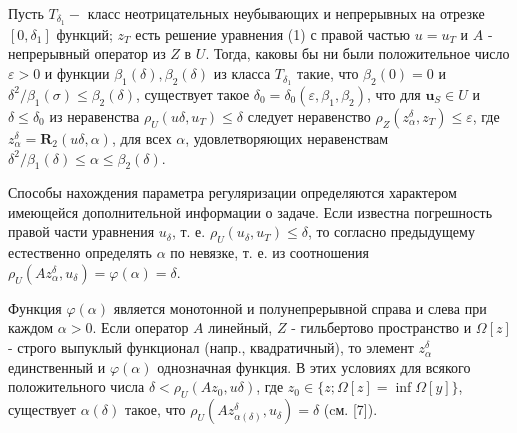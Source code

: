 \documentclass[10pt]{article}
\begin{document}
Пусть $T_{\delta_{1}}-$ класс неотрицательных неубывающих и непрерывных на отрезке $\left[0, \delta_{1}\right]$ функций; $z_{T}$ есть решение уравнения (1) с правой частью $u=u_{T}$ и $A$ - непрерывный оператор из $Z$ в $U$. Тогда, каковы бы ни были положительное число $\varepsilon>0$ и функции $\beta_{1}(\delta), \beta_{2}(\delta)$ из класса $T_{\delta_{1}}$ такие, что $\beta_{2}(0)=0$ и $\delta^{2} / \beta_{1}(\sigma) \leqslant \beta_{2}(\delta)$, существует такое $\delta_{0}=\delta_{0}\left(\varepsilon, \beta_{1}, \beta_{2}\right)$, что для $\boldsymbol{u}_{S} \in U$ и $\delta \leqslant \delta_{0}$ из неравенства $\rho_{U}\left(u \delta, u_{T}\right) \leqslant \delta$ следует неравенство $\rho_{Z}\left(z_{\alpha}^{\delta}, z_{T}\right) \leqslant \varepsilon$, где $z_{\alpha}^{\delta}=\boldsymbol{R}_{2}(u \delta, \alpha)$, для всех $\alpha$, удовлетворяющих неравенствам $\delta^{2} / \beta_{1}(\delta) \leqslant \alpha \leqslant \beta_{2}(\delta)$.



Способы нахождения параметра регуляризации определяются характером имеющейся дополнительной информации о задаче. Если известна погрешность правой части уравнения $u_{\delta}$, т. е. $\rho_{U}\left(u_{\delta}, u_{T}\right) \leqslant \delta$, то согласно предыдущему естественно определять $\alpha$ по невязке, т. е. из соотношения $\rho_{U}\left(A z_{\alpha}^{\delta}, u_{\delta}\right)=\varphi(\alpha)=\delta$.



Функция $\varphi(\alpha)$ является монотонной и полунепрерывной справа и слева при каждом $\alpha>0$. Если оператор $A$ линейный, $Z$ - гильбертово пространство и $\Omega[z]$ - строго выпуклый функционал (напр., квадратичный), то элемент $z_{\alpha}^{\delta}$ единственный и $\varphi(\alpha)$ однозначная функция. В этих условиях для всякого положительного числа $\delta<\rho_{U}\left(A z_{0}, u \delta\right)$, где $z_{0} \in\{z ; \Omega[z]=\inf \Omega[y]\}$, существует $\alpha(\delta)$ такое, что $\rho_{U}\left(A z_{\alpha(\delta)}^{\delta}, u_{\delta}\right)=\delta$ (cм. [7]).
\end{document}
